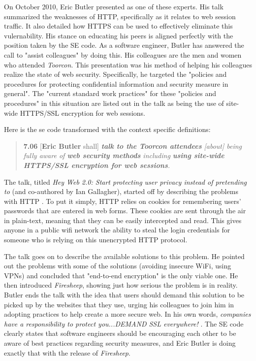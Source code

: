 \documentclass[11pt]{article}
\begin{document}
\begin{multicols}{2}
On October 2010, Eric Butler presented as one of these experts. His talk summarized the weaknesses of HTTP, specifically as it relates to web session traffic. It also detailed how HTTPS can be used to effectively eliminate this vulernability. His stance on educating his peers is aligned perfectly with the position taken by the SE code. As a software engineer, Butler has answered the call to "assist colleagues" by doing this. His colleagues are the men and women who attended \emph{Toorcon}. This presentation was his method of helping his colleagues realize the state of web security. Specifically, he targeted the "policies and procedures for protecting confidential information and security measure in general". The "current standard work practices" for these "policies and procedures" in this situation are listed out in the talk as being the use of site-wide HTTPS/SSL encryption for web sessions.

Here is the se code transformed with the context specific definitions:

\begin{quote}
  \textbf{7.06} [\textbf{Eric Butler} shall] \emph{\textbf{talk to the Toorcon attendees} [about] being fully aware of \textbf{web security methods} including \textbf{using site-wide HTTPS/SSL encryption for web sessions}.}
\end{quote}

The talk, titled \emph{Hey Web 2.0: Start protecting user privacy instead of pretending to} (and co-authored by Ian Gallagher), started off by describing the problems with HTTP \cite{toorcon_slides}. To put it simply, HTTP relies on cookies for remembering users' passwords that are entered in web forms. These cookies are sent through the air in plain-text, meaning that they can be easily intercepted and read. This gives anyone in a public wifi network the ability to steal the login credentials for someone who is relying on this unencrypted HTTP protocol.

The talk goes on to describe the available solutions to this problem. He pointed out the problems with some of the solutions (avoiding insecure WiFi, using VPNs) and concluded that "end-to-end encryption" is the only viable one. He then introduced \emph{Firesheep}, showing just how serious the problem is in reality. Butler ends the talk with the idea that users should demand this solution to be picked up by the websites that they use, urging his colleagues to join him in adopting practices to help create a more secure web. In his own words, \emph{companies have a responsibility to protect you...DEMAND SSL everywhere!} \cite{toorcon_slides}. The SE code clearly states that software engineers should be encouraging each other to be aware of best practices regarding security measures, and Eric Butler is doing exactly that with the release of \emph{Firesheep}.


\end{multicols}
\end{document}
